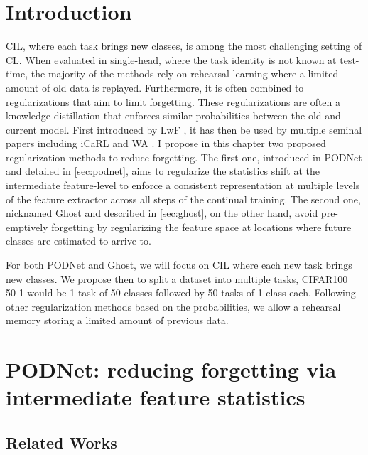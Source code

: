 
\section{Introduction}

\ac{CIL}, where each task brings new classes, is among the most challenging setting of \ac{CL}. When
evaluated in single-head, where the task identity is not known at test-time, the majority of the
methods rely on rehearsal learning where a limited amount of old data is replayed. Furthermore, it
is often combined to regularizations that aim to limit forgetting. These regularizations are often a
knowledge distillation \citep{hinton2015knowledge_distillation} that enforces similar probabilities
between the old and current model. First introduced by LwF \citep{li2018lwf}, it has then be used by
multiple seminal papers including iCaRL \citep{rebuffi2017icarl} and WA
\citep{zhao2020weightalignement}. I propose in this chapter two proposed regularization methods to
reduce forgetting. The first one, introduced in \ac{PODNet} \citep{douillard2020podnet} and detailed
in \autoref{sec:podnet}, aims to regularize the statistics shift at the intermediate feature-level
to enforce a consistent representation at multiple levels of the feature extractor across
all steps of the continual training. The second one, nicknamed Ghost \citep{douillard2020ghost} and
described in \autoref{sec:ghost}, on the other hand, avoid pre-emptively forgetting by regularizing the
feature space at locations where future classes are estimated to arrive to.

For both PODNet and Ghost, we will focus on \ac{CIL} where each new task brings new classes. We
propose then to split a dataset into multiple tasks, \ieg{} CIFAR100 50-1 would be 1 task of 50
classes followed by 50 tasks of 1 class each. Following other regularization methods based on the
probabilities, we allow a rehearsal memory storing a limited amount of previous data.

\section{PODNet: reducing forgetting via intermediate feature statistics}
\label{sec:podnet}

\subsection{Related Works}
\label{sec:podnet_related}

